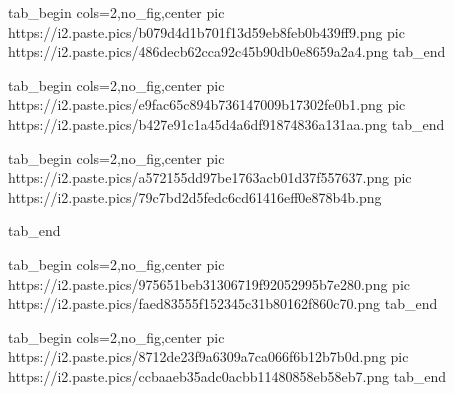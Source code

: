  
 
 
 
 
\zzSecCmtScr

\ifcmt
  tab_begin cols=2,no_fig,center
     pic https://i2.paste.pics/b079d4d1b701f13d59eb8feb0b439ff9.png
		 pic https://i2.paste.pics/486decb62cca92c45b90db0e8659a2a4.png
  tab_end
\fi

\ifcmt
  tab_begin cols=2,no_fig,center
		pic https://i2.paste.pics/e9fac65c894b736147009b17302fe0b1.png
		pic https://i2.paste.pics/b427e91c1a45d4a6df91874836a131aa.png
  tab_end
\fi

\ifcmt
  tab_begin cols=2,no_fig,center
		pic https://i2.paste.pics/a572155dd97be1763acb01d37f557637.png
		pic https://i2.paste.pics/79c7bd2d5fedc6cd61416eff0e878b4b.png

  tab_end
\fi

\ifcmt
  tab_begin cols=2,no_fig,center
		pic https://i2.paste.pics/975651beb31306719f92052995b7e280.png
		pic https://i2.paste.pics/faed83555f152345c31b80162f860c70.png
  tab_end
\fi

\ifcmt
  tab_begin cols=2,no_fig,center
		pic https://i2.paste.pics/8712de23f9a6309a7ca066f6b12b7b0d.png
		pic https://i2.paste.pics/ccbaaeb35adc0acbb11480858eb58eb7.png
  tab_end
\fi
